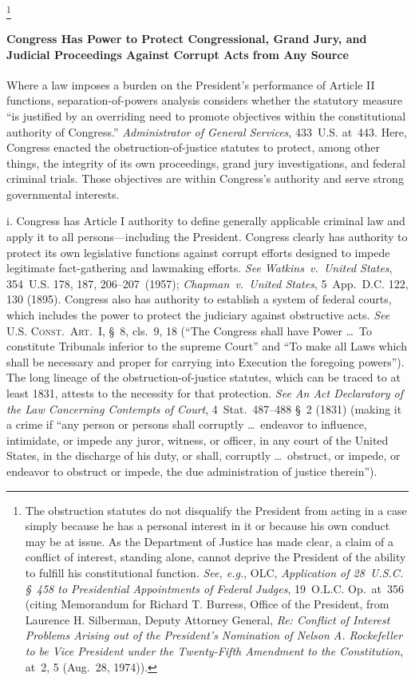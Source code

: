 \footnote{The obstruction statutes do not disqualify the President from acting in a case simply because he has a personal interest in it or because his own conduct may be at issue.
As the Department of Justice has made clear, a claim of a conflict of interest, standing alone, cannot deprive the President of the ability to fulfill his constitutional function.
\textit{See, e.g.}, OLC, \textit{Application of 28~U.S.C. \S~458 to Presidential Appointments of Federal Judges}, 19~O.L.C. Op.\ at~356 (citing Memorandum for Richard T. Burress, Office of the President, from Laurence H. Silberman, Deputy Attorney General, \textit{Re: Conflict of Interest Problems Arising out of the President's Nomination of Nelson A. Rockefeller to be Vice President under the Twenty-Fifth Amendment to the Constitution}, at~2, 5 (Aug.~28, 1974)).}

\paragraph{Congress Has Power to Protect Congressional, Grand Jury, and Judicial Proceedings Against Corrupt Acts from Any Source}

Where a law imposes a burden on the President's performance of Article II functions, separation-of-powers analysis considers whether the statutory measure ``is justified by an overriding need to promote objectives within the constitutional authority of Congress.''
\textit{Administrator of General Services}, 433~U.S. at~443.
Here, Congress enacted the obstruction-of-justice statutes to protect, among other things, the integrity of its own proceedings, grand jury investigations, and federal criminal trials.
Those objectives are within Congress's authority and serve strong governmental interests.

i. Congress has Article I authority to define generally applicable criminal law and apply it to all persons---including the President.
Congress clearly has authority to protect its own legislative functions against corrupt efforts designed to impede legitimate fact-gathering and lawmaking efforts.
\textit{See Watkins~v.\ United States}, 354~U.S. 178, 187, 206--207~(1957);
\textit{Chapman~v.\ United States}, 5~App.\ D.C. 122, 130 (1895).
Congress also has authority to establish a system of federal courts, which includes the power to protect the judiciary against obstructive acts.
\textit{See} \textsc{U.S. Const.\ Art.~I}, \S~8, cls.~9, 18 (``The Congress shall have Power \dots\ To constitute Tribunals inferior to the supreme Court'' and ``To make all Laws which shall be necessary and proper for carrying into Execution the foregoing powers'').
The long lineage of the obstruction-of-justice statutes, which can be traced to at least 1831, attests to the necessity for that protection.
\textit{See An Act Declaratory of the Law Concerning Contempts of Court}, 4~Stat.~487--488 \S~2 (1831) (making it a crime if ``any person or persons shall corruptly \dots\ endeavor to influence, intimidate, or impede any juror, witness, or officer, in any court of the United States, in the discharge of his duty, or shall, corruptly \dots\ obstruct, or impede, or endeavor to obstruct or impede, the due administration of justice therein'').

